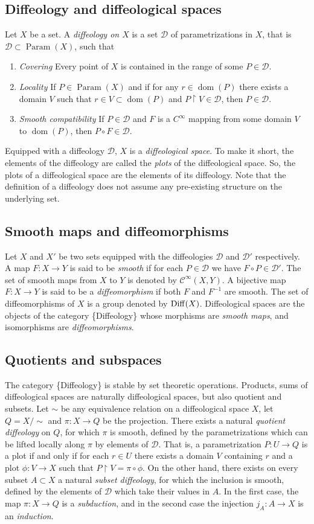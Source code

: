 \documentclass[10pt,reqno,twoside]{amsart}
\newcommand{\cC}{\mathcal{C}}
\newcommand{\cD}{\mathcal{D}}
\DeclareMathOperator{\Param}{Param}
\DeclareMathOperator{\dom}{dom}
\newcommand{\Cinfty}{C^\infty}
\theoremstyle{plain}
\theoremstyle{definition}
\newcommand{\article}[1]{\subsection{#1}}
\begin{document}
  \article{Diffeology and diffeological spaces}
  \label{Diffeology-and-diffeological-spaces}
  Let $X$ be a set.
  A {\em diffeology on $X$} is a set $\cD$ of parametrizations in $X$,
  that is ${\cD} \subset \Param(X)$,
  such that
  \begin{enumerate}
    \item[D1.] {\em Covering}\hspace{1em} Every point of $X$ is contained in the range of some $P\in \cD$.
    \item[D2.] {\em Locality}\hspace{1em} If $P \in\Param(X)$ and if for any $r \in \dom(P)$ there exists a domain $V$ such that $r \in V \subset \dom(P)$ and $P \restriction V \in \cD$,
    then $P\in {\cD}$.
    \item[D3.] {\em Smooth compatibility}\hspace{1em} If $P \in \cD$ and $F$ is a $\Cinfty$ mapping from some domain $V$ to $\dom(P)$, then $P \circ F \in {\cD}$.
  \end{enumerate}
  Equipped with a diffeology $\cD$,
  $X$ is a {\em diffeological space}.
  To make it short,
  the elements of the diffeology are called the {\em plots} of the diffeological space.
  So,
  the plots of a diffeological space are the elements of its diffeology.
  Note that the definition of a diffeology does not assume any pre-existing structure on the underlying set.
  
  \article{Smooth maps and diffeomorphisms}
  \label{Differentiable-maps-and-diffeomorphisms}
  Let $X$ and $X'$ be two sets equipped with the diffeologies $\cD$ and $\cD'$ respectively.
  A map $F : X \to Y$ is said to be {\em smooth} if for each $P \in \cD$ we have $F \circ P \in \cD'$.
  The set of smooth maps from $X$ to $Y$ is denoted by $\cC^{\infty}(X,Y)$.
  A bijective map $F : X \to Y$ is said to be a {\em diffeomorphism} if both $F$ and $F^{-1}$ are smooth.
  The set of diffeomorphisms of $X$ is a group denoted by ${\rm Diff}(X)$.
  Diffeological spaces are the objects of the category \{Diffeology\} whose morphisms are {\em smooth maps},
  and isomorphisms are {\em diffeomorphisms}.
  
  \article{Quotients and subspaces}
  \label{Quotient-and-subspaces}
  The category \{Diffeology\} is stable by set theoretic operations.
  Products,
  sums of diffeological spaces are naturally diffeological spaces,
  but also quotient and subsets.
  Let $\sim$ be any equivalence relation on a diffeological space $X$,
  let $Q = X/\!\!\sim$ and $\pi : X \to Q$ be the projection.
  There exists a natural {\em quotient diffeology} on $Q$,
  for which $\pi$ is smooth,
  defined by the parametrizations which can be lifted locally along $\pi$ by elements of $\cD$.
  That is,
  a parametrization $P : U \to Q$ is a plot if and only if for each $r \in U$ there exists a domain $V$ containing $r$ and a plot $\phi : V \to X$ such that $P \restriction V = \pi \circ \phi$.
  On the other hand,
  there exists on every subset $A \subset X$ a natural {\em subset diffeology},
  for which the inclusion is smooth,
  defined by the elements of $\cD$ which take their values in $A$.
  In the first case,
  the map $\pi : X \to Q$ is a {\em subduction},
  and in the second case the injection $j_A : A \to X$ is an {\em induction}.
  
\end{document}

